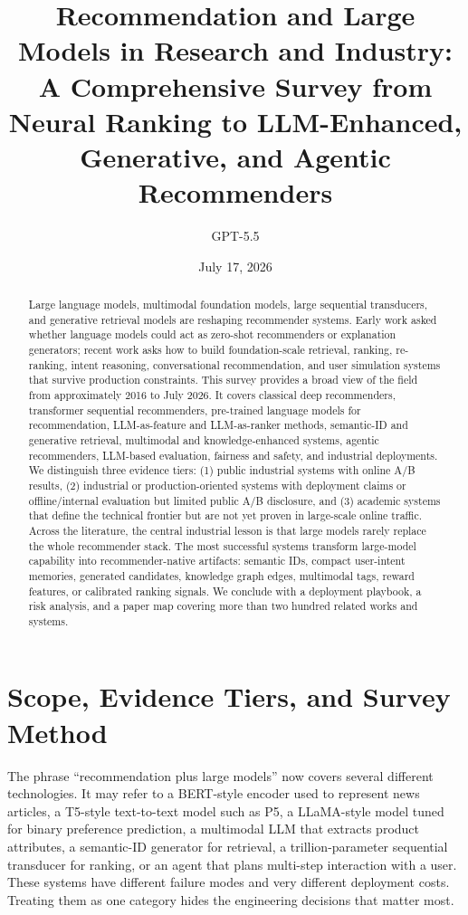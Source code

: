 \documentclass[11pt]{article}
\title{Recommendation and Large Models in Research and Industry:\\
A Comprehensive Survey from Neural Ranking to LLM-Enhanced, Generative, and Agentic Recommenders}
\author{GPT-5.5}
\date{July 17, 2026}
\begin{document}
\maketitle

\begin{abstract}
Large language models, multimodal foundation models, large sequential transducers, and generative retrieval models are reshaping recommender systems. Early work asked whether language models could act as zero-shot recommenders or explanation generators; recent work asks how to build foundation-scale retrieval, ranking, re-ranking, intent reasoning, conversational recommendation, and user simulation systems that survive production constraints. This survey provides a broad view of the field from approximately 2016 to July 2026. It covers classical deep recommenders, transformer sequential recommenders, pre-trained language models for recommendation, LLM-as-feature and LLM-as-ranker methods, semantic-ID and generative retrieval, multimodal and knowledge-enhanced systems, agentic recommenders, LLM-based evaluation, fairness and safety, and industrial deployments. We distinguish three evidence tiers: (1) public industrial systems with online A/B results, (2) industrial or production-oriented systems with deployment claims or offline/internal evaluation but limited public A/B disclosure, and (3) academic systems that define the technical frontier but are not yet proven in large-scale online traffic. Across the literature, the central industrial lesson is that large models rarely replace the whole recommender stack. The most successful systems transform large-model capability into recommender-native artifacts: semantic IDs, compact user-intent memories, generated candidates, knowledge graph edges, multimodal tags, reward features, or calibrated ranking signals. We conclude with a deployment playbook, a risk analysis, and a paper map covering more than two hundred related works and systems.
\end{abstract}

\tableofcontents

\section{Scope, Evidence Tiers, and Survey Method}

The phrase ``recommendation plus large models'' now covers several different technologies. It may refer to a BERT-style encoder used to represent news articles, a T5-style text-to-text model such as P5, a LLaMA-style model tuned for binary preference prediction, a multimodal LLM that extracts product attributes, a semantic-ID generator for retrieval, a trillion-parameter sequential transducer for ranking, or an agent that plans multi-step interaction with a user. These systems have different failure modes and very different deployment costs. Treating them as one category hides the engineering decisions that matter most.
\end{document}
